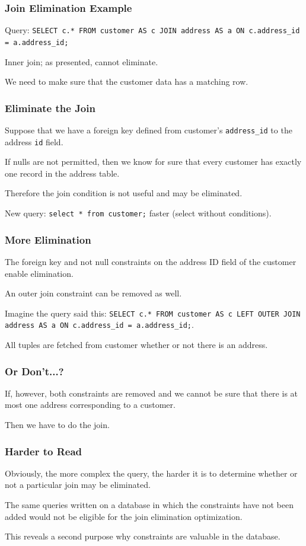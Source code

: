 \begin{frame}
\frametitle{Join Elimination Example}

Query: \texttt{SELECT c.* FROM customer AS c JOIN address AS a ON c.address\_id = a.address\_id;} 


Inner join; as presented, cannot eliminate.

We need to make sure that the customer data has a matching row.


\end{frame}

\begin{frame}
\frametitle{Eliminate the Join}

Suppose that we have a foreign key defined from customer's \texttt{address\_id} to the address \texttt{id} field. 

If nulls are not permitted, then we know for sure that every customer has exactly one record in the address table.

Therefore the join condition is not useful and may be eliminated. 

New query: \texttt{select * from customer;} faster (select without conditions).


\end{frame}

\begin{frame}
\frametitle{More Elimination}

The foreign key and not null constraints on the address ID field of the customer enable elimination.

An outer join constraint can be removed as well.

Imagine the query said this: \texttt{SELECT c.* FROM customer AS c LEFT OUTER JOIN address AS a ON c.address\_id = a.address\_id;}. 

All tuples are fetched from customer whether or not there is an address. 

\end{frame}

\begin{frame}
\frametitle{Or Don't...?}

If, however, both constraints are removed and we cannot be sure that there is at most one address corresponding to a customer.

Then we have to do the join.


\end{frame}

\begin{frame}
\frametitle{Harder to Read}
Obviously, the more complex the query, the harder it is to determine whether or not a particular join may be eliminated. 

The same queries written on a database in which the constraints have not been added would not be eligible for the join elimination optimization. 

This reveals a second purpose why constraints are valuable in the database.

\end{frame}

